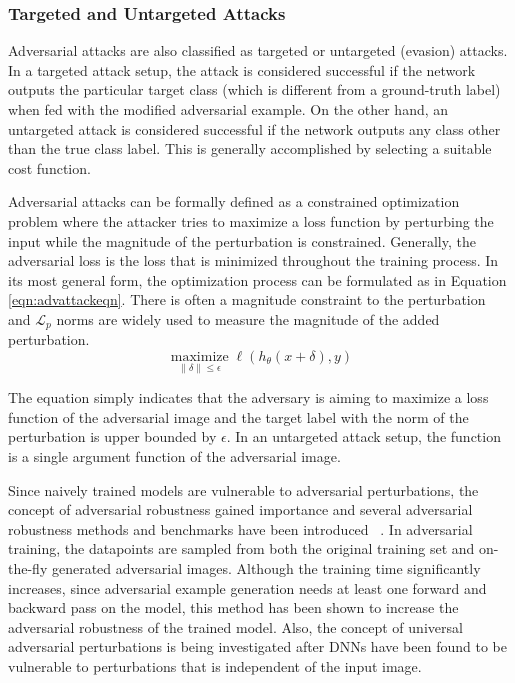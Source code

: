 \subsubsection*{Targeted and Untargeted Attacks}
Adversarial attacks are also classified as targeted or untargeted (evasion) attacks. In a targeted attack setup, the attack is considered successful if the network outputs the particular target class (which is different from a ground-truth label) when fed with the modified adversarial example. On the other hand, an untargeted attack is considered successful if the network outputs any class other than the true class label. This is generally accomplished by selecting a suitable cost function.

Adversarial attacks can be formally defined as a constrained optimization problem where the attacker tries to maximize a loss function by perturbing the input while the magnitude of the perturbation is constrained. Generally, the adversarial loss is the loss that is minimized throughout the training process. In its most general form, the optimization process can be formulated as in Equation \ref{eqn:advattackeqn}. There is often a magnitude constraint to the perturbation and \(\mathcal{L}_p\) norms are widely used to measure the magnitude of the added perturbation.
\begin{equation}
    \label{eqn:advattackeqn}
    \underset{\|\delta\| \leq \epsilon}{\operatorname{maximize}} \ell\left(h_{\theta}(x+\delta), y\right)
\end{equation}

The equation simply indicates that the adversary is aiming to maximize a loss function of the adversarial image and the target label with the norm of the perturbation is upper bounded by \(\epsilon\). In an untargeted attack setup, the function is a single argument function of the adversarial image.

Since naively trained models are vulnerable to adversarial perturbations, the concept of adversarial robustness gained importance and several adversarial robustness methods and benchmarks have been introduced ~\cite{madry2017towards,shafahi2019adversarial,shafahi2018adversarial,tramer2017ensemble,ross2018improving}. In adversarial training, the datapoints are sampled from both the original training set and on-the-fly generated adversarial images. Although the training time significantly increases, since adversarial example generation needs at least one forward and backward pass on the model, this method has been shown to increase the adversarial robustness of the trained model. Also, the concept of universal adversarial perturbations is being investigated after DNNs have been found to be vulnerable to perturbations that is independent of the input image.~\cite{sen2021training}

